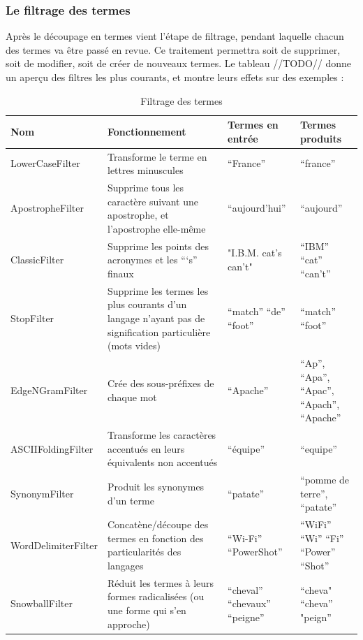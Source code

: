 \subsubsection{Le filtrage des termes}
\label{section:filtres}

Après le découpage en termes vient l’étape de filtrage, pendant laquelle chacun des termes va être passé en revue. Ce traitement permettra soit de supprimer, soit de modifier, soit de créer de nouveaux termes. Le tableau //TODO// donne un aperçu des filtres les plus courants, et montre leurs effets sur des exemples :

\begin{table}[!htbp]
                \centering
                \begin{tabular}{|p{3cm}|p{3cm}|p{3cm}|p{3cm}|}
                    \hline
                    \textbf{Nom} & \textbf{Fonctionnement} & \textbf{Termes en entrée} & \textbf{Termes produits}\\
                    \hline
LowerCaseFilter & Transforme le terme en lettres minuscules & “France” & “france”\\
\hline
ApostropheFilter & Supprime tous les caractère suivant une apostrophe, et l’apostrophe elle-même & “aujourd’hui” & “aujourd”\\
\hline
ClassicFilter & Supprime les points des acronymes et les “‘s” finaux & "I.B.M. cat's can't" & “IBM” “cat” “can’t”\\
\hline
StopFilter & Supprime les termes les plus courants d’un langage n’ayant pas de signification particulière (mots vides) & “match” “de” “foot” & “match” “foot”\\
\hline
EdgeNGramFilter & Crée des sous-préfixes de chaque mot & “Apache” & “Ap”, “Apa”, “Apac”, “Apach”, “Apache”\\
\hline
ASCIIFoldingFilter & Transforme les caractères accentués en leurs équivalents non accentués & “équipe” & “equipe”\\
\hline
SynonymFilter & Produit les synonymes d’un terme & “patate” & “pomme de terre”, “patate”\\
\hline
WordDelimiterFilter & Concatène/découpe des termes en fonction des particularités des langages & “Wi-Fi” “PowerShot” & “WiFi” “Wi” “Fi” “Power” “Shot”\\
\hline
SnowballFilter & Réduit les termes à leurs formes radicalisées (ou une forme qui s’en approche) & “cheval”  “chevaux”  “peigne” & “cheva" “cheva” "peign”\\
                    \hline

                \end{tabular}
                \caption{Filtrage des termes}
                \label{tab:filtrage_termes}
            \end{table}

